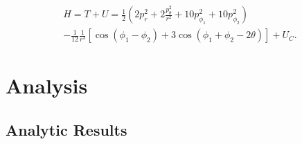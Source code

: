 \documentclass[prbg,preprint]{revtex4-1}
\begin{document}
\begin{equation}
  \begin{multlined}
	H=T+U=
	\frac{1}{2}\left (
	2 p_r^2
	+2 \frac{p_\theta^2}{r^2}
	+10 p_{\phi_1}^2 
	+10 p_{\phi_2}^2      
        \right )
        \\
	-
	\frac{1}{12}
	\frac{1}{r^3}[
	        \cos(\phi_1-\phi_2)
	        +3\cos(\phi_1+\phi_2 -2\theta)
	    ]+U_C.
  \end{multlined}
\end{equation}

\section{Analysis}
\subsection{Analytic Results}
\end{document}
